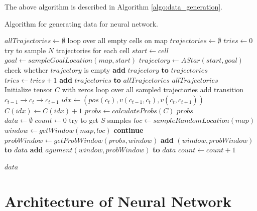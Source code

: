 The above algorithm is described in Algorithm \ref{algo:data_generation}. 

\begin{algorithm}
\caption{Algorithm for generating data for neural network.}
\label{algo:data_generation}
\begin{algorithmic}[1]
\State $allTrajectories \gets \emptyset$
    \Comment loop over all empty cells on map
	\State $trajectories \gets \emptyset $
	\State $tries \gets 0$
	\Comment try to sample $N$ trajectories for each cell
	\State $start \gets cell$
	\State $goal \gets sampleGoalLocation(map, start)$
	\State $trajectory \gets AStar(start, goal)$
		\Comment check whether $trajectory$ is empty
		\State \textbf{add} $trajectory$ \textbf{to} $trajectories$
	\EndIf
	\State $tries \gets tries+1$
	\EndWhile
	\State \textbf{add} $trajectories$ \textbf{to} $allTrajectories$
\EndFor
\State \Return $allTrajectories$
\EndProcedure
\\
\State Initialize tensor $C$ with zeros
    \Comment loop over all sampled trajectories
    \Comment add transition $c_{t-1} \rightarrow c_t \rightarrow c_{t+1}$
	\State  $idx \gets (pos(c_t), v(c_{t-1}, c_t), v(c_t, c_{t+1}))$
	\State $C(idx) \gets C(idx)+1$ 
    \EndFor
\EndFor
\State $probs \gets calculateProbs(C)$
\State \Return $probs$
\EndProcedure
\\
\State $data \gets \emptyset$ 
\State $count \gets 0$
	\Comment try to get $S$ samples
    \State $loc \gets sampleRandomLocation(map)$
    \State $window \gets getWindow(map, loc)$
    	\State \textbf{continue}
    \EndIf
    \State $probWindow \gets getProbWindow(probs, window)$
    \State \textbf{add} $(window, probWindow)$ \textbf{to} $data$
    \State \textbf{add} $agument(window, probWindow)$ \textbf{to} $data$
    \State $count \gets count+1$
\EndWhile

\State \Return $data$
\EndProcedure
\end{algorithmic}
\end{algorithm}

\section{Architecture of Neural Network} \label{sec:training}

